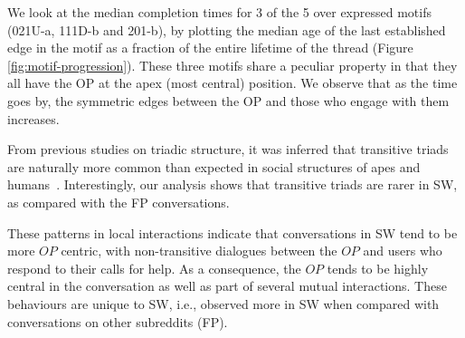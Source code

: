We look at the median completion times for 3 of the 5 over expressed motifs (021U-a, 111D-b and 201-b), by plotting the median age of the last established edge in the motif as a fraction of the entire lifetime of the thread (Figure \ref{fig:motif-progression}). These three motifs share a peculiar property in that they all have the OP at the apex (most central) position. We observe that as the time goes by, the symmetric edges between the OP and those who engage with them increases.  

From previous studies on triadic structure, it was inferred that transitive triads are naturally more common than expected in social structures of apes and humans~\cite{shizuka2015network}. Interestingly, our analysis shows that transitive triads are rarer in SW, as compared with the FP conversations. 

These patterns in local interactions indicate that conversations in SW tend to be more $OP$ centric, with non-transitive dialogues between the $OP$ and users who respond to their calls for help. As a consequence, the $OP$ tends to be highly central in the conversation as well as part of several mutual interactions. These behaviours are unique to SW, i.e., observed more in SW when compared with conversations on other subreddits (FP).  


